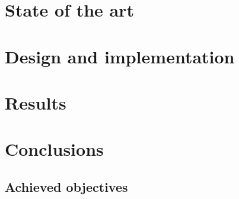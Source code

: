 \documentclass[a4paper, 12pt]{book}
\begin{document}
\cleardoublepage
\chapter{State of the art}
\label{sec:state-art}


\cleardoublepage
\chapter{Design and implementation}
\label{sec:design-implementation}


\cleardoublepage
\chapter{Results}
\label{sec:results}


\cleardoublepage
\chapter{Conclusions}
\label{sec:conclusions}


\section{Achieved objectives}
\label{sec:achieved-objectives}
\end{document}
